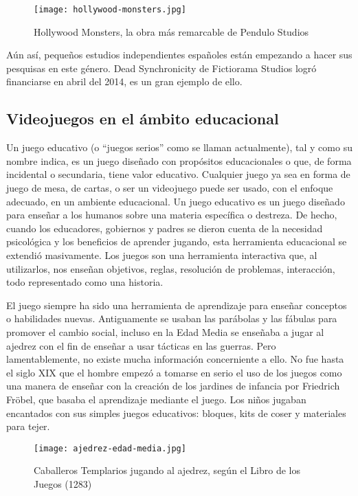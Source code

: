 \begin{figure}[H] 
  \begin{center}
    \texttt{[image: hollywood-monsters.jpg]}
  \end{center}
  \caption{Hollywood Monsters, la obra más remarcable de Pendulo Studios}
    \label{fig:hollywood-monsters}
\end{figure}

Aún así, pequeños estudios independientes españoles están empezando a hacer sus  pesquisas en este género. Dead Synchronicity  de Fictiorama Studios logró financiarse en abril del 2014, es un gran ejemplo de ello.

\subsection{Videojuegos en el ámbito educacional}
Un juego educativo (o ``juegos serios'' como se llaman actualmente), tal y como su nombre indica, es un juego diseñado con propósitos educacionales o que, de forma incidental o secundaria, tiene valor educativo. Cualquier juego ya sea en forma de juego de mesa, de cartas, o ser un videojuego puede ser usado, con el enfoque adecuado, en un ambiente educacional. Un juego educativo es un juego diseñado para enseñar a los humanos sobre una materia específica o destreza. De hecho, cuando los educadores, gobiernos y padres se dieron cuenta de la necesidad psicológica y los beneficios de aprender jugando, esta herramienta educacional se extendió masivamente. Los juegos son una herramienta interactiva que, al utilizarlos, nos enseñan objetivos, reglas, resolución de problemas, interacción, todo representado como una historia.

El juego siempre ha sido una herramienta de aprendizaje para enseñar conceptos o habilidades nuevas. Antiguamente se usaban las parábolas y las fábulas para promover el cambio social, incluso en la Edad Media se enseñaba a jugar al ajedrez con el fin de enseñar a usar tácticas en las guerras. Pero lamentablemente, no existe mucha información concerniente a ello. No fue hasta el siglo XIX que el hombre empezó a tomarse en serio el uso de los juegos como una manera de enseñar con la creación de los jardines de infancia por Friedrich Fröbel, que basaba el aprendizaje mediante el juego. Los niños jugaban encantados con sus simples juegos educativos: bloques, kits de coser y materiales para tejer.

\begin{figure}[H] 
	\begin{center}
		\texttt{[image: ajedrez-edad-media.jpg]}
	\end{center}
	\caption{Caballeros Templarios jugando al ajedrez, según el Libro de los Juegos (1283)}
	\label{fig:ajedrez-edad-media}
\end{figure}

